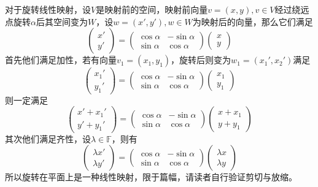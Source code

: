 对于旋转线性映射，设$V$是映射前的空间，映射前向量$v=(x,y),v\in V$经过绕远点旋转$\alpha$后其空间变为$W$，设$w=(x',y'),w\in W$为映射后的向量，那么它们满足$$
\begin{pmatrix}  
	x' \\  
	y'  
  \end{pmatrix} =\begin{pmatrix}  
	\cos \alpha & -\sin \alpha  \\  
	\sin \alpha & \cos \alpha   
  \end{pmatrix} \begin{pmatrix}  
	x \\  
	y
  \end{pmatrix} 
$$
首先他们满足加性，若有向量$v_1=(x_1,y_1)$，旋转后则变为$w_1=(x_1',x_2')$满足
$$
\begin{pmatrix}  
	x_1' \\  
	y_1'  
  \end{pmatrix} =\begin{pmatrix}  
	\cos \alpha & -\sin \alpha  \\  
	\sin \alpha & \cos \alpha   
  \end{pmatrix} \begin{pmatrix}  
	x_1 \\  
	y_1
  \end{pmatrix} 
$$
则一定满足
$$
\begin{pmatrix}  
	x'+x_1' \\  
	y'+y_1'  
  \end{pmatrix} =\begin{pmatrix}  
	\cos \alpha & -\sin \alpha  \\  
	\sin \alpha & \cos \alpha   
  \end{pmatrix} \begin{pmatrix}  
	x+x_1 \\  
	y+y_1
  \end{pmatrix} 
$$
其次他们满足齐性，设$\lambda \in \mathbb{F}$，则有
$$
\begin{pmatrix}  
	\lambda x' \\  
	\lambda y'  
  \end{pmatrix} =\begin{pmatrix}  
	\cos \alpha & -\sin \alpha  \\  
	\sin \alpha & \cos \alpha   
  \end{pmatrix} \begin{pmatrix}  
	\lambda x \\  
	\lambda y
  \end{pmatrix} 
$$
所以旋转在平面上是一种线性映射，限于篇幅，请读者自行验证剪切与放缩。

